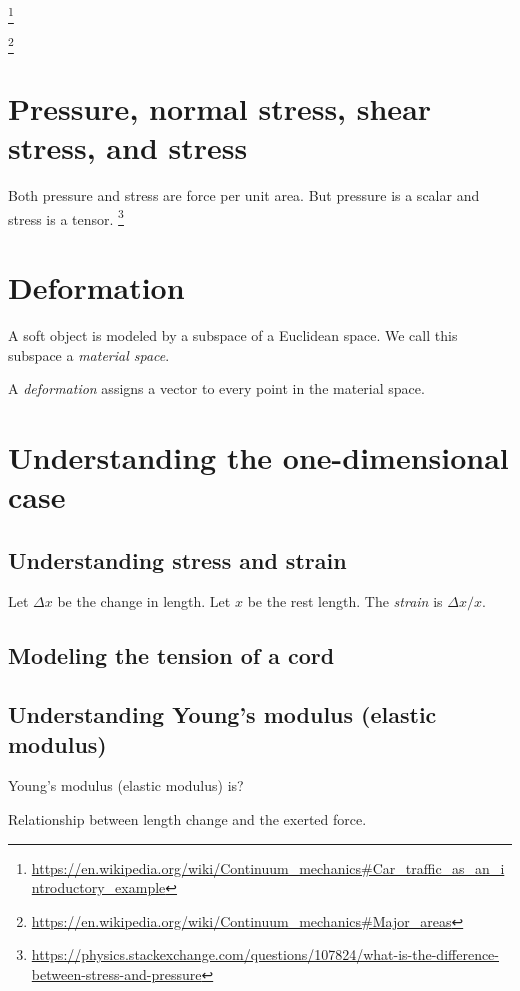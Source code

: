 \footnote{\url{https://en.wikipedia.org/wiki/Continuum_mechanics\#Car_traffic_as_an_introductory_example}}

\footnote{\url{https://en.wikipedia.org/wiki/Continuum_mechanics\#Major_areas}}

\section{Pressure, normal stress, shear stress, and stress}

Both pressure and stress are force per unit area.
But pressure is a scalar and stress is a tensor.%
\footnote{\url{https://physics.stackexchange.com/questions/107824/what-is-the-difference-between-stress-and-pressure}}

\section{Deformation}

A soft object is modeled by a subspace of a Euclidean space.
We call this subspace a \emph{material space}.

A \emph{deformation} assigns a vector to every point in the material space.

\section{Understanding the one-dimensional case}

\subsection{Understanding stress and strain}

Let \(\Delta x\) be the change in length.
Let \(x\) be the rest length.
The \emph{strain} is \( \Delta x / x \).

\subsection{Modeling the tension of a cord}

\subsection{Understanding Young's modulus (elastic modulus)}

Young's modulus (elastic modulus) is?

Relationship between length change and the exerted force.

